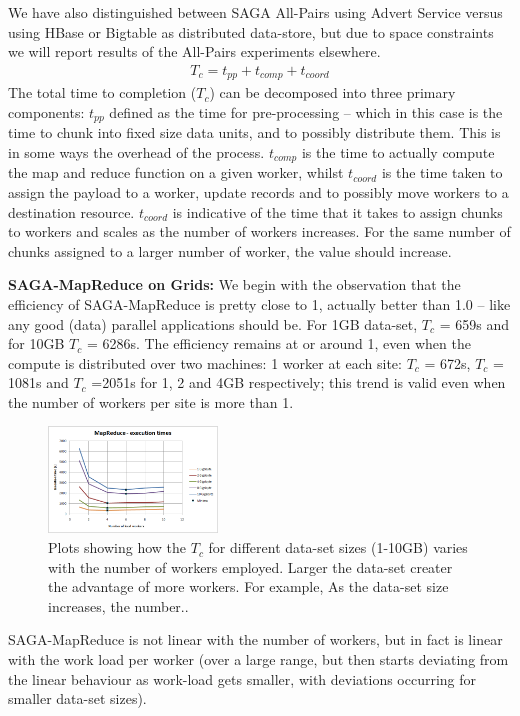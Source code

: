 \documentclass[conference,final]{IEEEtran}
\newcommand{\sagamapreduce }{SAGA-MapReduce }
\newcommand{\tc }{ $T_c$ }
\begin{document}
We have also distinguished between SAGA All-Pairs using Advert Service
versus using HBase or Bigtable as distributed data-store, but due to
space constraints we will report results of the All-Pairs experiments
elsewhere.
\begin{eqnarray}
T_c = t_{pp} + t_{comp} + t_{coord}
\end{eqnarray}
The total time to completion ($T_c$) can be decomposed into three
primary components: $t_{pp}$ defined as the time for pre-processing --
which in this case is the time to chunk into fixed size data units,
and to possibly distribute them. This is in some ways the overhead of
the process.  $t_{comp}$ is the time to actually compute the map and
reduce function on a given worker, whilst $t_{coord}$ is the time
taken to assign the payload to a worker, update records and to
possibly move workers to a destination resource. $t_{coord}$ is
indicative of the time that it takes to assign chunks to workers and
scales as the number of workers increases. For the same number of
chunks assigned to a larger number of worker, the value should
increase.


{\bf SAGA-MapReduce on Grids:} We begin with the observation that the
efficiency of \sagamapreduce is pretty close to 1, actually better
than 1.0 -- like any good (data) parallel applications should be.  For
1GB data-set, \tc = 659s and for 10GB \tc = 6286s.  The efficiency
remains at or around 1, even when the compute is distributed over two
machines: 1 worker at each site: \tc = 672s, \tc = 1081s and \tc
=2051s for 1, 2 and 4GB respectively; this trend is valid even when
the number of workers per site is more than 1.
\begin{figure}[t]
  \includegraphics[width=0.4\textwidth]{MapReduce_local_executiontime.png}
\caption{Plots showing how the \tc for different data-set sizes
  (1-10GB) varies with the number of workers employed.
  Larger the data-set creater the advantage of more workers. For
  example, As the data-set size increases, the number..}
\label{grids1}
\end{figure}
\sagamapreduce is not linear with the number of workers, but in fact
is linear with the work load per worker (over a large range, but then starts deviating from the linear behaviour as work-load gets smaller, with deviations
occurring for smaller data-set sizes). %
\end{document}
